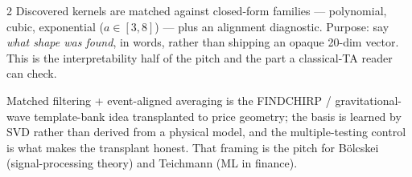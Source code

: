 \documentclass[10pt,a4paper]{article}
\begin{document}
\begin{multicols}{2}
Discovered kernels are matched against closed-form families — polynomial, cubic, exponential
($a\in[3,8]$) — plus an alignment diagnostic. Purpose: say \emph{what shape was found}, in words, rather
than shipping an opaque 20-dim vector. This is the interpretability half of the pitch and the part a
classical-TA reader can check.

Matched filtering + event-aligned averaging is the FINDCHIRP / gravitational-wave template-bank idea
transplanted to price geometry; the basis is learned by SVD rather than derived from a physical model,
and the multiple-testing control is what makes the transplant honest. That framing is the pitch for
Bölcskei (signal-processing theory) and Teichmann (ML in finance).

\end{multicols}

\end{document}
